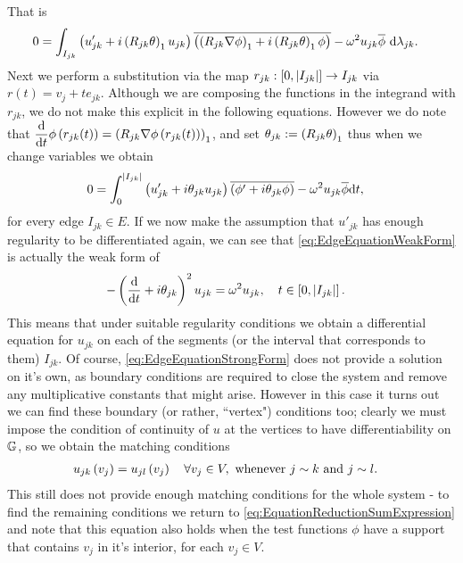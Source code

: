 That is
\begin{align*}
	0 &= \int_{I_{jk}}\left( u_{jk}' + i\left( R_{jk}\theta \right)_1 u_{jk} \right)\overline{\left( \left( R_{jk}\nabla\phi \right)_1 + i\left( R_{jk}\theta \right)_1 \phi \right)} - \omega^2 u_{jk}\overline{\phi} \ \mathrm{d}\lambda_{jk}.
\end{align*}
Next we perform a substitution via the map $r_{jk}:\left[ 0,\left\lvert I_{jk} \right\rvert \right]\rightarrow I_{jk}$ via $r(t) = v_{j}+t e_{jk}$.
Although we are composing the functions in the integrand with $r_{jk}$, we do not make this explicit in the following equations.
However we do note that $\dfrac{\mathrm{d}}{\mathrm{d}t}\phi\left( r_{jk}(t) \right) = \left( R_{jk}\nabla\phi\left( r_{jk}(t) \right) \right)_1$, and set $\theta_{jk} := \left( R_{jk}\theta \right)_1$ thus when we change variables we obtain
\begin{align} \label{eq:EdgeEquationWeakForm}
	0 &= \int_0^{\left\lvert I_{jk} \right\rvert} \left(  u'_{jk} + i\theta_{jk}u_{jk}  \right) \overline{\left(  \phi' + i\theta_{jk}\phi  \right)} - \omega^2 u_{jk}\overline{\phi} \mathrm{d} t,
\end{align}
for every edge $I_{jk}\in E$. 
If we now make the assumption that $u'_{jk}$ has enough regularity to be differentiated again, we can see that \eqref{eq:EdgeEquationWeakForm} is actually the weak form of
\begin{align} \label{eq:EdgeEquationStrongForm}
	-\left( \dfrac{\mathrm{d}}{\mathrm{d}t} + i\theta_{jk} \right)^2 u_{jk} &= \omega^2 u_{jk}, \quad t\in\left[ 0,\left\lvert I_{jk} \right\rvert \right].
\end{align}
This means that under suitable regularity conditions we obtain a differential equation for $u_{jk}$ on each of the segments (or the interval that corresponds to them) $I_{jk}$.
Of course, \eqref{eq:EdgeEquationStrongForm} does not provide a solution on it's own, as boundary conditions are required to close the system and remove any multiplicative constants that might arise.
However in this case it turns out we can find these boundary (or rather, ``vertex") conditions too; clearly we must impose the condition of continuity of $u$ at the vertices to have differentiability on $\mathbb{G}$, so we obtain the matching conditions
\begin{align} \label{eq:EdgeEquationsMatchingConditons}
	u_{jk}\left( v_j \right) &= u_{jl}\left( v_j \right) \quad \forall v_j\in V, \text{ whenever } j\sim k \text{ and } j\sim l.
\end{align}
This still does not provide enough matching conditions for the whole system - to find the remaining conditions we return to \eqref{eq:EquationReductionSumExpression} and note that this equation also holds when the test functions $\phi$ have a support that contains $v_j$ in it's interior, for each $v_j\in V$.
